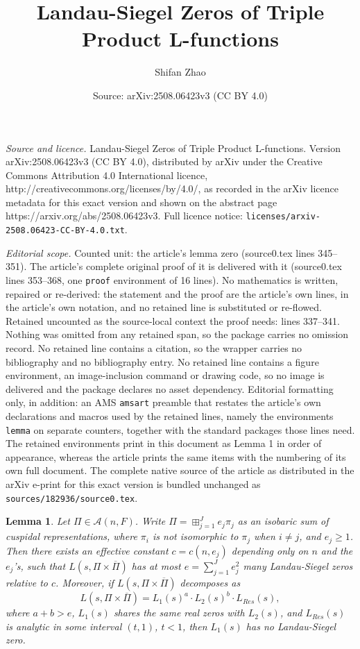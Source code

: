 \documentclass[10pt,a4paper]{amsart}
\title{Landau-Siegel Zeros of Triple Product L-functions}
\author{Shifan Zhao}
\date{Source: arXiv:2508.06423v3 (CC BY 4.0)}
\newtheorem{lemma}{Lemma}
\newcommand{\cA}{\mathcal{A}}
\newcommand{\ov}{\overline}
\begin{document}
\maketitle

\noindent\emph{Source and licence.} Landau-Siegel Zeros of Triple Product L-functions. Version arXiv:2508.06423v3 (CC BY 4.0), distributed by arXiv under the Creative Commons Attribution 4.0 International licence, http://creativecommons.org/licenses/by/4.0/, as recorded in the arXiv licence metadata for this exact version and shown on the abstract page https://arxiv.org/abs/2508.06423v3. Full licence notice: \texttt{licenses/arxiv-2508.06423-CC-BY-4.0.txt}.\par\smallskip

\noindent\textit{Editorial scope.} Counted unit: the article's lemma zero (source0.tex lines 345--351). The article's complete original proof of it is delivered with it (source0.tex lines 353--368, one \texttt{proof} environment of 16 lines). No mathematics is written, repaired or re-derived: the statement and the proof are the article's own lines, in the article's own notation, and no retained line is substituted or re-flowed.  Retained uncounted as the source-local context the proof needs: lines 337--341.  Nothing was omitted from any retained span, so the package carries no omission record.  No retained line contains a citation, so the wrapper carries no bibliography and no bibliography entry.  No retained line contains a figure environment, an image-inclusion command or drawing code, so no image is delivered and the package declares no asset dependency.  Editorial formatting only, in addition: an AMS \texttt{amsart} preamble that restates the article's own declarations and macros used by the retained lines, namely the environments \texttt{lemma} on separate counters, together with the standard packages those lines need.  The retained environments print in this document as Lemma 1 in order of appearance, whereas the article prints the same items with the numbering of its own full document.  The complete native source of the article as distributed in the arXiv e-print for this exact version is bundled unchanged as \texttt{sources/182936/source0.tex}.
\begin{lemma}\label{Landau-Siegel zero lemma}
    Let $\Pi \in \cA(n,F)$. Write $\Pi = \boxplus_{j=1}^J e_j\pi_j$ as an isobaric sum of cuspidal representations, where $\pi_i$ is not isomorphic to $\pi_j$ when $i \neq j$, and $e_j \geq 1$. Then there exists an effective constant $c = c(n,e_j)$ depending only on $n$ and the $e_j$'s, such that $L(s,\Pi \times \ov{\Pi})$ has at most $e = \sum_{j=1}^J e_j^2$ many Landau-Siegel zeros relative to $c$. Moreover, if $L(s,\Pi \times \ov{\Pi})$ decomposes as 
    $$L(s,\Pi \times \ov{\Pi}) = L_1(s)^a \cdot L_2(s)^b \cdot L_{Res}(s),$$
    where $a+b > e$, $L_1(s)$ shares the same real zeros with $L_2(s)$, and $L_{Res}(s)$ is analytic in some interval $(t,1)$, $t<1$, then $L_1(s)$ has no Landau-Siegel zero.
\end{lemma}
\end{document}
